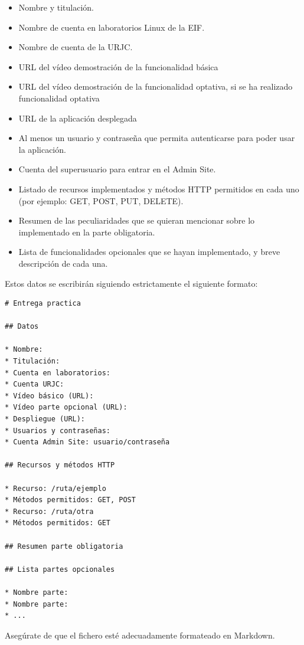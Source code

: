\begin{itemize}
\begin{itemize}
  \item Nombre y titulación.
  \item Nombre de cuenta en laboratorios Linux de la EIF.
  \item Nombre de cuenta de la URJC.
  \item URL del vídeo demostración de la funcionalidad básica
  \item URL del vídeo demostración de la funcionalidad optativa, si se ha realizado funcionalidad optativa
  \item URL de la aplicación desplegada
  \item Al menos un usuario y contraseña que permita autenticarse para poder usar la aplicación.
  \item Cuenta del superusuario para entrar en el Admin Site.
  \item Listado de recursos implementados y métodos HTTP permitidos en cada uno (por ejemplo: GET, POST, PUT, DELETE).
  \item Resumen de las peculiaridades que se quieran mencionar sobre lo implementado en la parte obligatoria.
  \item Lista de funcionalidades opcionales que se hayan implementado, y breve descripción de cada una.
\end{itemize}

Estos datos se escribirán siguiendo estrictamente el siguiente formato:

\begin{verbatim}
# Entrega practica

## Datos

* Nombre:
* Titulación:
* Cuenta en laboratorios:
* Cuenta URJC:
* Vídeo básico (URL):
* Vídeo parte opcional (URL):
* Despliegue (URL):
* Usuarios y contraseñas:
* Cuenta Admin Site: usuario/contraseña

## Recursos y métodos HTTP

* Recurso: /ruta/ejemplo
* Métodos permitidos: GET, POST
* Recurso: /ruta/otra
* Métodos permitidos: GET

## Resumen parte obligatoria

## Lista partes opcionales

* Nombre parte:
* Nombre parte:
* ...
\end{verbatim}

Asegúrate de que el fichero esté adecuadamente formateado en Markdown.
\end{itemize}


